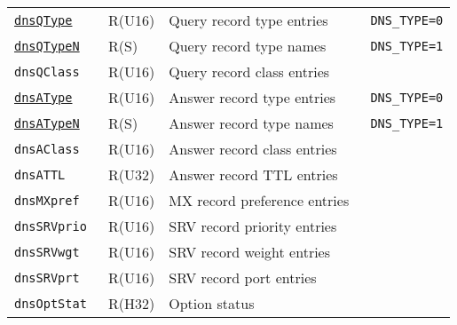 \documentclass[documentation]{subfiles}
\begin{document}
\begin{longtable}{>{\tt}lll>{\tt\small}l}
    \hyperref[dnsTypeBF]{dnsQType}  & R(U16)   & Query record type entries     & DNS\_TYPE=0\\
    \hyperref[dnsTypeBF]{dnsQTypeN} & R(S)     & Query record type names       & DNS\_TYPE=1\\
    dnsQClass                       & R(U16)   & Query record class entries    & \\
    \hyperref[dnsTypeBF]{dnsAType}  & R(U16)   & Answer record type entries    & DNS\_TYPE=0\\
    \hyperref[dnsTypeBF]{dnsATypeN} & R(S)     & Answer record type names      & DNS\_TYPE=1\\
    dnsAClass                       & R(U16)   & Answer record class entries   & \\
    dnsATTL                         & R(U32)   & Answer record TTL entries     & \\
    dnsMXpref                       & R(U16)   & MX record preference entries  & \\
    dnsSRVprio                      & R(U16)   & SRV record priority entries   & \\
    dnsSRVwgt                       & R(U16)   & SRV record weight entries     & \\
    dnsSRVprt                       & R(U16)   & SRV record port entries       & \\
    dnsOptStat                      & R(H32)   & Option status                 & \\
    \bottomrule
\end{longtable}
\end{document}
